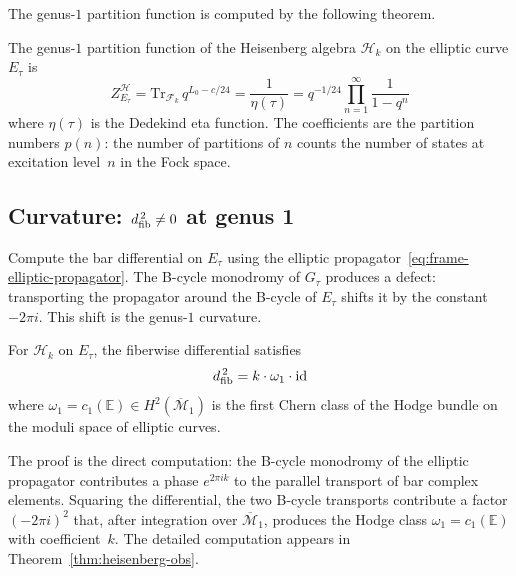 The genus-$1$ partition function is computed by the following theorem.

\begin{theorem}\label{thm:genus1-heisenberg}
The genus-$1$ partition function of the Heisenberg algebra $\mathcal{H}_k$ on the elliptic curve $E_\tau$ is
\begin{equation}\label{eq:frame-partition-g1}
Z_{E_\tau}^{\mathcal{H}} =
\mathrm{Tr}_{\mathcal{F}_k}\, q^{L_0 - c/24}
= \frac{1}{\eta(\tau)}
= q^{-1/24}\prod_{n=1}^{\infty}\frac{1}{1-q^n}
\end{equation}
where $\eta(\tau)$ is the Dedekind eta function.  The coefficients
are the partition numbers $p(n)$: the number of partitions of $n$
counts the number of states at excitation level~$n$ in the
Fock space.
\end{theorem}

\subsection{\texorpdfstring{Curvature: $d_{\mathrm{fib}}^{\,2} \neq 0$ at genus 1}{Curvature: d fib squared is not zero at genus 1}}

Compute the bar differential on $E_\tau$ using the elliptic
propagator~\eqref{eq:frame-elliptic-propagator}.  The B-cycle
monodromy of $G_\tau$ produces a defect: transporting the
propagator around the B-cycle of $E_\tau$ shifts it by the
constant $-2\pi i$.  This shift is the genus-$1$ curvature.

\begin{theorem}\label{thm:frame-genus1-curvature}
For $\mathcal{H}_k$ on $E_\tau$, the fiberwise differential satisfies
\begin{equation}\label{eq:frame-dsquared-genus1}
d_{\mathrm{fib}}^{\,2} = k \cdot \omega_1 \cdot \mathrm{id}
\end{equation}
where $\omega_1 = c_1(\mathbb{E}) \in H^2(\overline{\mathcal{M}}_1)$
is the first Chern class of the Hodge bundle on the moduli space
of elliptic curves.
\end{theorem}

The proof is the direct computation: the B-cycle monodromy of the
elliptic propagator contributes a phase $e^{2\pi i k}$ to the
parallel transport of bar complex elements.  Squaring the
differential, the two B-cycle transports contribute a factor
$(-2\pi i)^2$ that, after integration over $\overline{\mathcal{M}}_1$,
produces the Hodge class $\omega_1 = c_1(\mathbb{E})$ with
coefficient~$k$.  The detailed computation appears in
Theorem~\ref{thm:heisenberg-obs}.

